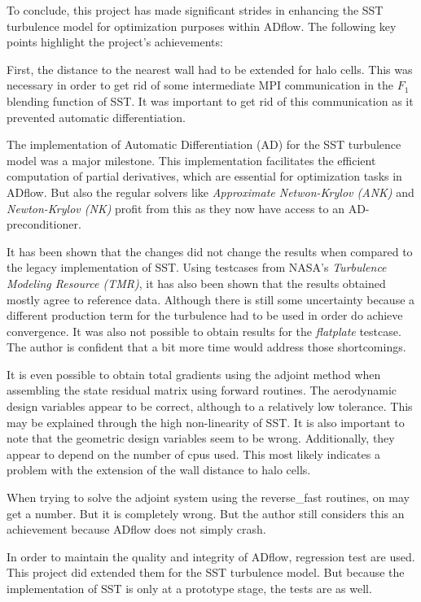 To conclude, this project has made significant strides in enhancing the SST
turbulence model for optimization purposes within ADflow. The following key
points highlight the project's achievements:

First, the distance to the nearest wall had to be extended for halo cells. This
was necessary in order to get rid of some intermediate MPI communication in the
$F_1$ blending function of SST. It was important to get rid of this
communication as it prevented automatic differentiation.

The implementation of Automatic Differentiation (AD) for the SST turbulence
model was a major milestone. This implementation facilitates the efficient
computation of partial derivatives, which are essential for optimization tasks
in ADflow. But also the regular solvers like \textit{Approximate Netwon-Krylov
(ANK)} and \textit{Newton-Krylov (NK)} profit from this as they now have access
to an AD-preconditioner.

It has been shown that the changes did not change the results when compared to
the legacy implementation of SST. Using testcases from NASA's
\textit{Turbulence Modeling Resource (TMR)}, it has also been shown that the
results obtained mostly agree to reference data. Although there is still some
uncertainty because a different production term for the turbulence had to be
used in order do achieve convergence. It was also not possible to obtain
results for the \textit{flatplate} testcase. The author is confident that a bit
more time would address those shortcomings.

It is even possible to obtain total gradients using the adjoint method when
assembling the state residual matrix using forward routines. The aerodynamic
design variables appear to be correct, although to a relatively low tolerance.
This may be explained through the high non-linearity of SST. It is also
important to note that the geometric design variables seem to be wrong.
Additionally, they appear to depend on the number of cpus used. This most
likely indicates a problem with the extension of the wall distance to halo
cells.

When trying to solve the adjoint system using the reverse\_fast routines, on
may get a number. But it is completely wrong. But the author still considers
this an achievement because ADflow does not simply crash.

In order to maintain the quality and integrity of ADflow, regression test are
used. This project did extended them for the SST turbulence model. But because
the implementation of SST is only at a prototype stage, the tests are as well.

